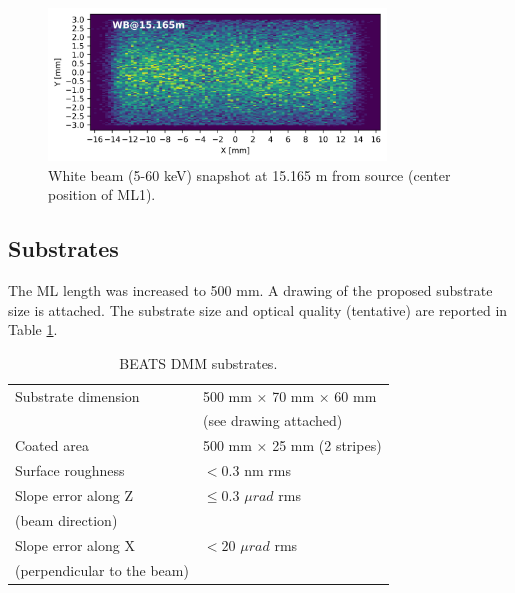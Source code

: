 \setlength{\belowcaptionskip}{-8pt}
\vspace*{-\baselineskip}

\begin{figure} [!ht]
\centering
\includegraphics[width=0.8\textwidth]{./../../beam_snapshots/WB_snapshot_15.165.png}
\caption{\label{fig:snapshot_ML1} White beam (5-60 keV) snapshot at 15.165 m from source (center position of ML1).}
\end{figure}
\setlength{\belowcaptionskip}{-15pt}

\clearpage
\subsection{Substrates}
The ML length was increased to 500 mm. A drawing of the proposed substrate size is attached. The substrate size and optical quality (tentative) are reported in Table \ref{tab:substrates}.

\begin{center}
\begin{table} [ht]
\begin{tabular}[bhp]{|p{} | p{}|}
\hline
Substrate dimension & 500 mm × 70 mm × 60 mm \\
 & (see drawing attached) \\
\hline
Coated area & 500 mm × 25 mm (2 stripes) \\
\hline
Surface roughness & $< 0.3$ nm rms \\
\hline
Slope error along Z & $\leq 0.3$ $\mu rad$ rms \\
(beam direction) & \\
\hline
Slope error along X & $< 20$ $\mu rad$ rms \\
(perpendicular to the beam) & \\
\hline
\end{tabular}
\caption{\label{tab:substrates} BEATS DMM substrates.}
\end{table}
\end{center}

